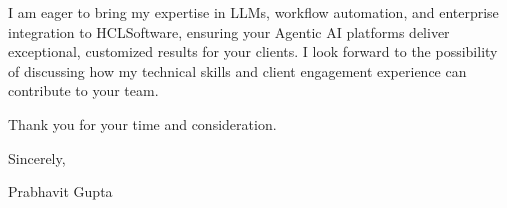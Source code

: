 \documentclass[11pt,a4paper]{article}
\begin{document}
I am eager to bring my expertise in LLMs, workflow automation, and enterprise integration to HCLSoftware, ensuring your Agentic AI platforms deliver exceptional, customized results for your clients. I look forward to the possibility of discussing how my technical skills and client engagement experience can contribute to your team.

Thank you for your time and consideration.

\vspace{5mm}
Sincerely,

\vspace{2mm}
Prabhavit Gupta
\end{document}
